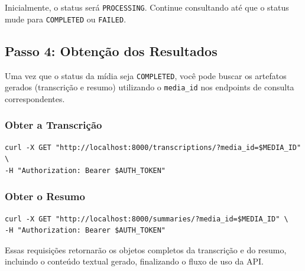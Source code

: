 Inicialmente, o status será \texttt{PROCESSING}. Continue consultando até que o status mude para \texttt{COMPLETED} ou \texttt{FAILED}.

\subsection{Passo 4: Obtenção dos Resultados}

Uma vez que o status da mídia seja \texttt{COMPLETED}, você pode buscar os artefatos gerados (transcrição e resumo) utilizando o \texttt{media\_id} nos endpoints de consulta correspondentes.

\subsubsection{Obter a Transcrição}

\begin{verbatim}
curl -X GET "http://localhost:8000/transcriptions/?media_id=$MEDIA_ID" \
-H "Authorization: Bearer $AUTH_TOKEN"
\end{verbatim}

\subsubsection{Obter o Resumo}

\begin{verbatim}
curl -X GET "http://localhost:8000/summaries/?media_id=$MEDIA_ID" \
-H "Authorization: Bearer $AUTH_TOKEN"
\end{verbatim}

Essas requisições retornarão os objetos completos da transcrição e do resumo, incluindo o conteúdo textual gerado, finalizando o fluxo de uso da API.
